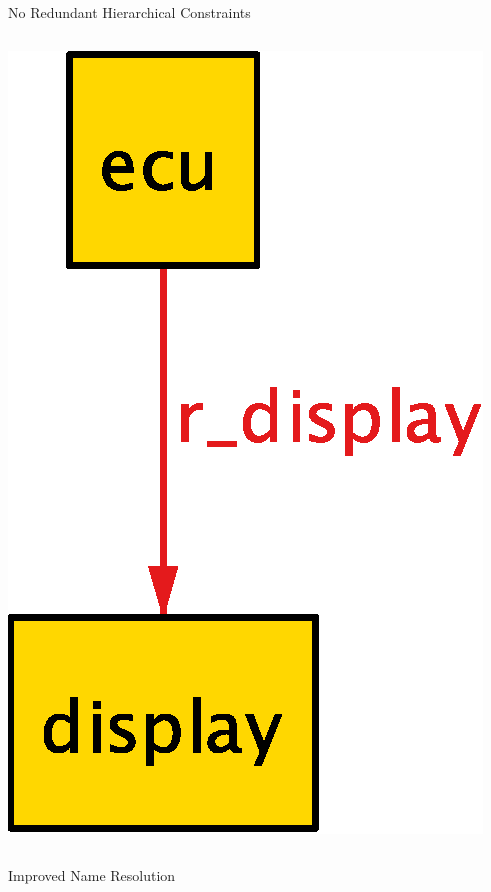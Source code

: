 \documentclass[table,15pt,t]{beamer}
\newcounter{i}
\begin{document}
\begin{frame}{No Redundant Hierarchical Constraints}
\begin{columns}
\begin{column}{0.5\textwidth}
      \includegraphics[scale=0.5]{figs/parent-new}
    \end{column}
  \end{columns}
\end{frame}

\begin{frame}{Improved Name Resolution}
\end{frame}
\end{document}
